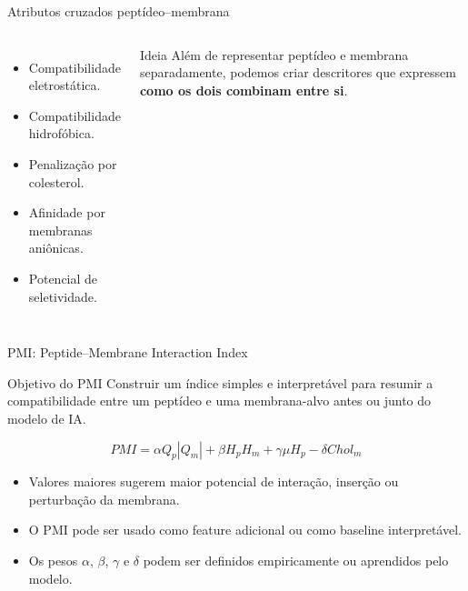 \documentclass[aspectratio=169,10pt]{beamer}
\begin{document}
\begin{frame}{Atributos cruzados peptídeo--membrana}
\begin{columns}[T]
\begin{itemize}
  \item Compatibilidade eletrostática.
  \item Compatibilidade hidrofóbica.
  \item Penalização por colesterol.
  \item Afinidade por membranas aniônicas.
  \item Potencial de seletividade.
\end{itemize}

\begin{block}{Ideia}
\small
Além de representar peptídeo e membrana separadamente, podemos criar descritores que expressem \textbf{como os dois combinam entre si}.
\end{block}
\end{columns}

\vspace{0.25cm}
\begin{center}
\end{center}
\end{frame}

\begin{frame}{PMI: Peptide--Membrane Interaction Index}
\begin{block}{Objetivo do PMI}
Construir um índice simples e interpretável para resumir a compatibilidade entre um peptídeo e uma membrana-alvo antes ou junto do modelo de IA.
\end{block}

\vspace{0.2cm}
\begin{equation*}
PMI = \alpha Q_p|Q_m| + \beta H_pH_m + \gamma \mu H_p - \delta Chol_m
\end{equation*}

\vspace{0.1cm}
\begin{itemize}
  \item Valores maiores sugerem maior potencial de interação, inserção ou perturbação da membrana.
  \item O PMI pode ser usado como feature adicional ou como baseline interpretável.
  \item Os pesos $\alpha$, $\beta$, $\gamma$ e $\delta$ podem ser definidos empiricamente ou aprendidos pelo modelo.
\end{itemize}
\end{frame}
\end{document}
